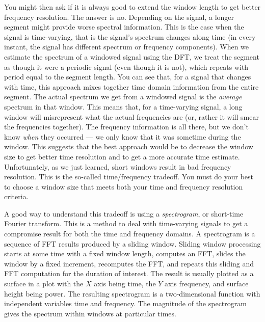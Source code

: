 You might then ask if it is always good to extend the window length to
get better frequency resolution. The answer is no. Depending on the
signal, a longer segment might provide worse spectral
information. This is the case when the signal is time-varying, that is
the signal's spectrum changes along time (in every instant, the signal
has different spectrum or frequency components). When we estimate the
spectrum of a windowed signal using the DFT, we treat the segment as
though it were a periodic signal (even though it is not), which
repeats with period equal to the segment length. You can see that, for
a signal that changes with time, this approach mixes together time
domain information from the entire segment. The actual spectrum we get
from a windowed signal is the \emph{average} spectrum in that
window. This means that, for a time-varying signal, a long window will
misrepresent what the actual frequencies are (or, rather it will smear
the frequencies together). The frequency information is all there, but
we don't know \emph{when} they occurred --- we only know that it was
sometime during the window. This suggests that the best approach would
be to decrease the window size to get better time resolution and to
get a more accurate time estimate. Unfortunately, as we just learned,
short windows result in bad frequency resolution. This is the
so-called time/frequency tradeoff. You must do your best to choose a
window size that meets both your time and frequency resolution
criteria.

A good way to understand this tradeoff is using a \emph{spectrogram},
or short-time Fourier transform. This is a method to deal with
time-varying signals to get a compromise result for both the time and
frequency domains.  A spectrogram is a sequence of FFT results
produced by a sliding window. Sliding window processing starts at some
time with a fixed window length, computes an FFT, slides the window by
a fixed increment, recomputes the FFT, and repeats this sliding and
FFT computation for the duration of interest. The result is usually
plotted as a surface in a plot with the $X$ axis being time, the $Y$
axis frequency, and surface height being power.  The resulting
spectrogram is a two-dimensional function with independent variables
time and frequency. The magnitude of the spectrogram gives the
spectrum within windows at particular times.

